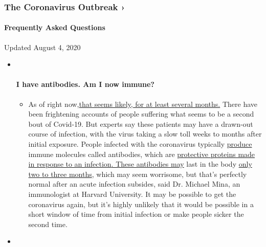 \hypertarget{the-coronavirus-outbreak-}{%
\subsubsection{The Coronavirus Outbreak
›}\label{the-coronavirus-outbreak-}}

\hypertarget{frequently-asked-questions}{%
\paragraph{Frequently Asked
Questions}\label{frequently-asked-questions}}

Updated August 4, 2020

\begin{itemize}
\item ~
  \hypertarget{i-have-antibodies-am-i-now-immune}{%
  \paragraph{I have antibodies. Am I now
  immune?}\label{i-have-antibodies-am-i-now-immune}}

  \begin{itemize}
  \tightlist
  \item
    As of right
    now,\href{https://www.nytimes3xbfgragh.onion/2020/07/22/health/covid-antibodies-herd-immunity.html?action=click\&pgtype=Article\&state=default\&region=MAIN_CONTENT_3\&context=storylines_faq}{that
    seems likely, for at least several months.} There have been
    frightening accounts of people suffering what seems to be a second
    bout of Covid-19. But experts say these patients may have a
    drawn-out course of infection, with the virus taking a slow toll
    weeks to months after initial exposure. People infected with the
    coronavirus typically
    \href{https://www.nature.com/articles/s41586-020-2456-9}{produce}
    immune molecules called antibodies, which are
    \href{https://www.nytimes3xbfgragh.onion/2020/05/07/health/coronavirus-antibody-prevalence.html?action=click\&pgtype=Article\&state=default\&region=MAIN_CONTENT_3\&context=storylines_faq}{protective
    proteins made in response to an
    infection}\href{https://www.nytimes3xbfgragh.onion/2020/05/07/health/coronavirus-antibody-prevalence.html?action=click\&pgtype=Article\&state=default\&region=MAIN_CONTENT_3\&context=storylines_faq}{.
    These antibodies may} last in the body
    \href{https://www.nature.com/articles/s41591-020-0965-6}{only two to
    three months}, which may seem worrisome, but that's perfectly normal
    after an acute infection subsides, said Dr. Michael Mina, an
    immunologist at Harvard University. It may be possible to get the
    coronavirus again, but it's highly unlikely that it would be
    possible in a short window of time from initial infection or make
    people sicker the second time.
  \end{itemize}
\item ~
  \hypertarget{im-a-small-business-owner-can-i-get-relief}{%
}
\end{itemize}

